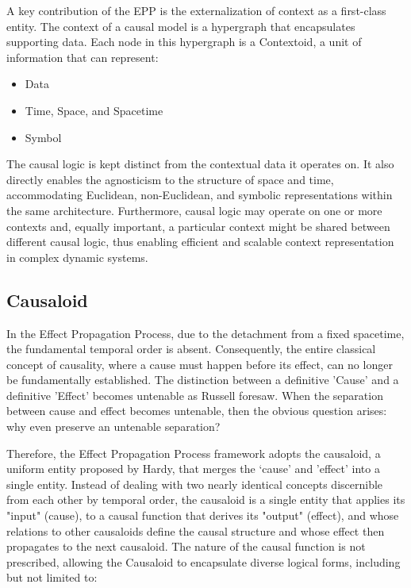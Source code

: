 A key contribution of the EPP is the externalization of context as a first-class entity.
The context of a causal model is a hypergraph that encapsulates supporting data. 
Each node in this hypergraph is a Contextoid, a unit of information that can represent:

\begin{itemize}
	\item Data
	\item Time, Space, and Spacetime
	\item Symbol 
\end{itemize}

The causal logic is kept distinct from the contextual data it operates on. It also directly enables the  agnosticism to the structure of space and time, accommodating Euclidean, non-Euclidean, and symbolic representations within the same architecture. Furthermore,  causal logic  may operate on one or more contexts and, equally important, a particular context might be shared between different causal logic, thus enabling efficient and scalable context representation in complex dynamic systems. 

%
%
\subsection{Causaloid}
\label{sec:epp_causaloid}

In the Effect Propagation Process, due to the detachment from a fixed spacetime, the fundamental temporal order is absent. Consequently, the entire classical concept of causality, where a cause must happen before its effect, can no longer be fundamentally established. The distinction between a definitive 'Cause' and a definitive 'Effect' becomes untenable as Russell foresaw. When the separation between cause and effect becomes untenable, then the obvious question arises: why even preserve an untenable separation?

Therefore, the Effect Propagation Process framework adopts the causaloid, a uniform entity proposed by Hardy\cite{HardyDynamicCausalStructure}, that merges the ‘cause' and 'effect' into a single entity. Instead of dealing with two nearly identical concepts discernible from each other by temporal order, the causaloid is a single entity that applies its "input" (cause), to a causal function that derives its "output" (effect), and whose relations to other causaloids define the causal structure and whose effect then propagates to the next causaloid. The nature of the causal function is not prescribed, allowing the Causaloid to encapsulate diverse logical forms, including but not limited to:

